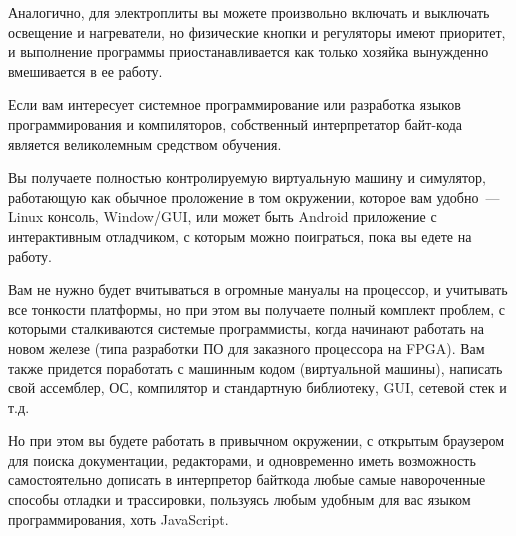 Аналогично, для электроплиты вы можете произвольно включать и выключать
освещение и нагреватели, но физические кнопки и регуляторы имеют приоритет, и
выполнение программы приостанавливается как только хозяйка вынужденно
вмешивается в ее работу.

\clearpage
{}

Если вам интересует системное программирование или разработка языков
программирования и компиляторов, собственный интерпретатор байт-кода является
великолемным средством обучения.

Вы получаете полностью контролируемую виртуальную машину и симулятор, работающую
как обычное проложение в том окружении, которое вам удобно\ --- Linux консоль,
Window/GUI, или может быть Android приложение с интерактивным отладчиком, с
которым можно поиграться, пока вы едете на работу.

Вам не нужно будет вчитываться в огромные мануалы на процессор, и учитывать все
тонкости платформы, но при этом вы получаете полный комплект проблем, с которыми
сталкиваются системые программисты, когда начинают работать на новом железе
(типа разработки ПО для заказного процессора на FPGA). Вам также придется
поработать с машинным кодом (виртуальной машины), написать свой ассемблер, ОС,
компилятор и стандартную библиотеку, GUI, сетевой стек и т.д.

Но при этом вы будете работать в привычном окружении, с открытым браузером для
поиска документации, редакторами, и одновременно иметь возможность
самостоятельно дописать в интерпретор байткода любые самые навороченные способы
отладки и трассировки, пользуясь любым удобным для вас языком программирования,
хоть JavaScript.

\secup
